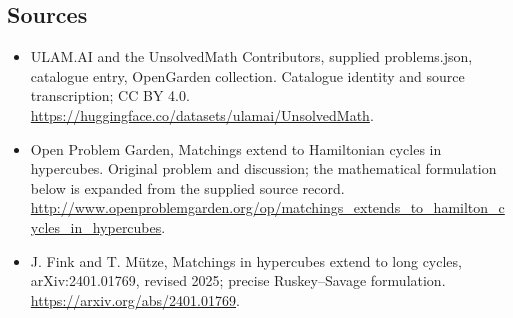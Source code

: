 \documentclass[11pt,a4paper]{article}
\begin{document}
\subsection{Sources}
\begin{itemize}
\item[S1] ULAM.AI and the UnsolvedMath Contributors, supplied problems.json, catalogue entry, OpenGarden collection. Catalogue identity and source transcription; CC BY 4.0.
\url{https://huggingface.co/datasets/ulamai/UnsolvedMath}.
\item[S2] Open Problem Garden, Matchings extend to Hamiltonian cycles in hypercubes. Original problem and discussion; the mathematical formulation below is expanded from the supplied source record.
\url{http://www.openproblemgarden.org/op/matchings_extends_to_hamilton_cycles_in_hypercubes}.
\item[S3] J. Fink and T. Mütze, Matchings in hypercubes extend to long cycles, arXiv:2401.01769, revised 2025; precise Ruskey–Savage formulation.
\url{https://arxiv.org/abs/2401.01769}.

\end{itemize}
\end{document}
